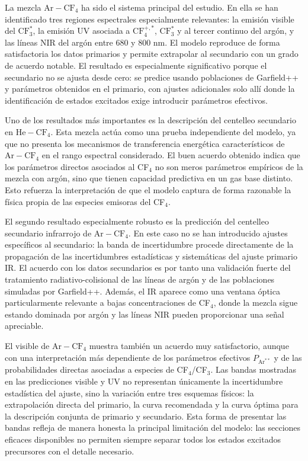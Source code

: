 \documentclass[12pt,a4paper]{article}
\newcommand{\He}{\mathrm{He}}
\newcommand{\Ar}{\mathrm{Ar}}
\newcommand{\CF}{\mathrm{CF}}
\begin{document}
La mezcla $\Ar-\CF_4$ ha sido el sistema principal del estudio. En ella se han identificado tres regiones espectrales especialmente relevantes: la emisión visible del $\CF_3^*$, la emisión UV asociada a $\CF_4^{+,*}$, $\CF_3^*$ y al tercer continuo del argón, y las líneas NIR del argón entre 680 y 800 nm. El modelo reproduce de forma satisfactoria los datos primarios y permite extrapolar al secundario con un grado de acuerdo notable. El resultado es especialmente significativo porque el secundario no se ajusta desde cero: se predice usando poblaciones de Garfield++ y parámetros obtenidos en el primario, con ajustes adicionales solo allí donde la identificación de estados excitados exige introducir parámetros efectivos.

Uno de los resultados más importantes es la descripción del centelleo secundario en $\He-\CF_4$. Esta mezcla actúa como una prueba independiente del modelo, ya que no presenta los mecanismos de transferencia energética característicos de $\Ar-\CF_4$ en el rango espectral considerado. El buen acuerdo obtenido indica que los parámetros directos asociados al CF$_4$ no son meros parámetros empíricos de la mezcla con argón, sino que tienen capacidad predictiva en un gas base distinto. Esto refuerza la interpretación de que el modelo captura de forma razonable la física propia de las especies emisoras del CF$_4$.

El segundo resultado especialmente robusto es la predicción del centelleo secundario infrarrojo de $\Ar-\CF_4$. En este caso no se han introducido ajustes específicos al secundario: la banda de incertidumbre procede directamente de la propagación de las incertidumbres estadísticas y sistemáticas del ajuste primario IR. El acuerdo con los datos secundarios es por tanto una validación fuerte del tratamiento radiativo-colisional de las líneas de argón y de las poblaciones simuladas por Garfield++. Además, el IR aparece como una ventana óptica particularmente relevante a bajas concentraciones de CF$_4$, donde la mezcla sigue estando dominada por argón y las líneas NIR pueden proporcionar una señal apreciable.

El visible de $\Ar-\CF_4$ muestra también un acuerdo muy satisfactorio, aunque con una interpretación más dependiente de los parámetros efectivos $P_{\Ar^{**}}$ y de las probabilidades directas asociadas a especies de CF$_4$/CF$_3$. Las bandas mostradas en las predicciones visible y UV no representan únicamente la incertidumbre estadística del ajuste, sino la variación entre tres esquemas físicos: la extrapolación directa del primario, la curva recomendada y la curva óptima para la descripción conjunta de primario y secundario. Esta forma de presentar las bandas refleja de manera honesta la principal limitación del modelo: las secciones eficaces disponibles no permiten siempre separar todos los estados excitados precursores con el detalle necesario.
\end{document}
